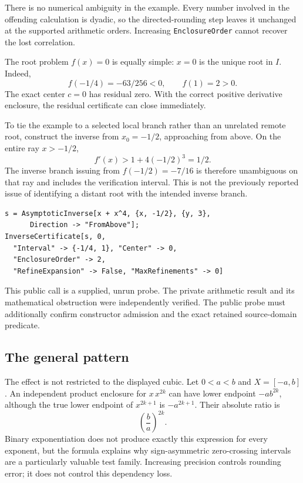 \documentclass[11pt,a4paper]{article}
\newcommand{\code}[1]{\nolinkurl{#1}}
\begin{document}
There is no numerical ambiguity in the example. Every number involved in the offending calculation is dyadic, so the directed-rounding step leaves it unchanged at the supported arithmetic orders. Increasing \code{EnclosureOrder} cannot recover the lost correlation.

The root problem $f(x)=0$ is equally simple: $x=0$ is the unique root in $I$. Indeed,
\[
f(-1/4)=-63/256<0,\qquad f(1)=2>0.
\]
The exact center $c=0$ has residual zero. With the correct positive derivative enclosure, the residual certificate can close immediately.

To tie the example to a selected local branch rather than an unrelated remote root, construct the inverse from $x_0=-1/2$, approaching from above. On the entire ray $x>-1/2$,
\[
f'(x)>1+4(-1/2)^3=1/2.
\]
The inverse branch issuing from $f(-1/2)=-7/16$ is therefore unambiguous on that ray and includes the verification interval. This is not the previously reported issue of identifying a distant root with the intended inverse branch.

\begin{lstlisting}
s = AsymptoticInverse[x + x^4, {x, -1/2}, {y, 3},
      Direction -> "FromAbove"];
InverseCertificate[s, 0,
  "Interval" -> {-1/4, 1}, "Center" -> 0,
  "EnclosureOrder" -> 2,
  "RefineExpansion" -> False, "MaxRefinements" -> 0]
\end{lstlisting}

This public call is a supplied, unrun probe. The private arithmetic result and its mathematical obstruction were independently verified. The public probe must additionally confirm constructor admission and the exact retained source-domain predicate.

\subsection{The general pattern}

The effect is not restricted to the displayed cubic. Let $0<a<b$ and $X=[-a,b]$. An independent product enclosure for $x\,x^{2k}$ can have lower endpoint $-ab^{2k}$, although the true lower endpoint of $x^{2k+1}$ is $-a^{2k+1}$. Their absolute ratio is
\[
\left(\frac ba\right)^{2k}.
\]
Binary exponentiation does not produce exactly this expression for every exponent, but the formula explains why sign-asymmetric zero-crossing intervals are a particularly valuable test family. Increasing precision controls rounding error; it does not control this dependency loss.
\end{document}
